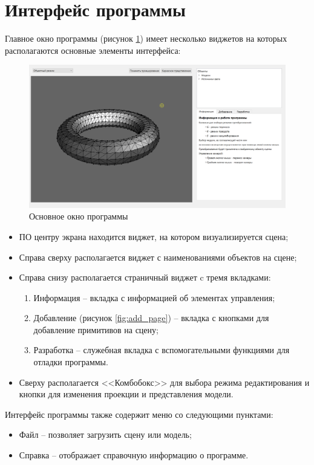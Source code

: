 \section{Интерфейс программы}

Главное окно программы (рисунок \ref{fig:interface}) имеет несколько виджетов на которых располагаются основные элементы интерфейса:

\begin{figure}[h]
	\centering
	\includegraphics[scale=0.5]{inc/img/interface.png}
	\caption{Основное окно программы}
	\label{fig:interface}
\end{figure} 


\begin{itemize}[label=---]
	\item ПО центру экрана находится виджет, на котором визуализируется сцена;
	\item Справа сверху располагается виджет с наименованиями объектов на сцене;
	\item Справа снизу располагается страничный виджет c тремя вкладками:
	\begin{enumerate}
		\item Информация -- вкладка с информацией об элементах управления;
		\item Добавление (рисунок \ref{fig:add_page}) -- вкладка с кнопками для добавление примитивов на сцену;
		\item Разработка -- служебная вкладка с вспомогательными функциями для отладки программы.
	\end{enumerate}
	\item Сверху располагается <<Комбобокс>> для выбора режима редактирования и кнопки для изменения проекции и представления модели.
\end{itemize}

Интерфейс программы также содержит меню со следующими пунктами:
\begin{itemize}[label=---]
	\item Файл -- позволяет загрузить сцену или модель;
	\item Справка -- отображает справочную информацию о программе.
\end{itemize}

